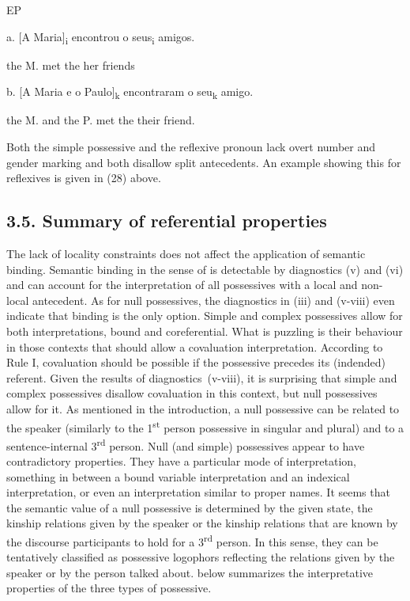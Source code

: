\documentclass[output=paper]{langsci/langscibook}
\begin{document}
          EP

  a.  [A Maria]\textsubscript{i} encontrou o seus\textsubscript{i} amigos.

the M. met the her friends

  b.  [A Maria e o Paulo]\textsubscript{k} encontraram o seu\textsubscript{k} amigo.

the M. and the P. met the their friend.

Both the simple possessive and the reflexive pronoun lack overt number and gender marking and both disallow split antecedents. An example showing this for reflexives is given in (28) above. 

\subsection{ 3.5. Summary of referential properties}

The lack of locality constraints does not affect the application of semantic binding. Semantic binding in the sense of \citet{Reinhart2006} is detectable by diagnostics (v) and (vi) and can account for the interpretation of all possessives with a local and non-local antecedent. As for null possessives, the diagnostics in (iii) and (v-viii) even indicate that binding is the only option. Simple and complex possessives allow for both interpretations, bound and coreferential. What is puzzling is their behaviour in those contexts that should allow a covaluation interpretation. According to Rule I, covaluation should be possible if the possessive precedes its (indended) referent. Given the results of diagnostics~(v-viii), it is surprising that simple and complex possessives disallow covaluation in this context, but null possessives allow for it. As mentioned in the introduction, a null possessive can be related to the speaker (similarly to the 1\textsuperscript{st} person possessive in singular and plural) and to a sentence-internal 3\textsuperscript{rd} person. Null (and simple) possessives appear to have contradictory properties. They have a particular mode of interpretation, something in between a bound variable interpretation and an indexical interpretation, or even an interpretation similar to proper names. It seems that the semantic value of a null possessive is determined by the given state, the kinship relations given by the speaker or the kinship relations that are known by the discourse participants to hold for a 3\textsuperscript{rd} person. In this sense, they can be tentatively classified as possessive logophors reflecting the relations given by the speaker or by the person talked about.  below summarizes the interpretative properties of the three types of possessive.
\end{document}
